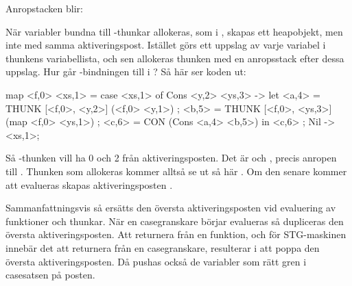 \documentclass[../Core]{subfiles}
\begin{document}
Anropstacken blir:
\begin{codeEx}
\end{codeEx}

När variabler bundna till -thunkar allokeras, som 
i , skapas ett heapobjekt, men inte med samma aktiveringspost.
Istället görs ett uppslag av varje variabel i thunkens variabellista, och
sen allokeras thunken med en anropsstack efter dessa uppslag. Hur går 
-bindningen till i ? Så här ser koden ut:

\begin{codeEx}
map <f,0> <xs,1> = case <xs,1> of
    { Cons <y,2> <ys,3> -> let
        { <a,4> = THUNK [<f,0>, <y,2>]  (<f,0> <y,1>)
        ; <b,5> = THUNK [<f,0>, <ys,3>] (map <f,0> <ys,1>)
        ; <c,6> = CON (Cons <a,4> <b,5>)
        } in <c,6>
    ; Nil -> <xs,1>};
\end{codeEx}

Så -thunken  vill ha 0 och 2 från
aktiveringsposten. Det är  och , precis anropen till
. 
Thunken som allokeras kommer alltså se ut så här
.
Om den senare kommer att evalueras skapas aktiveringsposten \ic{[cube,1]}.


Sammanfattningsvis så ersätts den översta aktiveringsposten vid 
evaluering av funktioner och thunkar. När en casegranskare börjar evalueras
så dupliceras den översta aktiveringsposten. Att returnera från en funktion,
och för STG-maskinen innebär det att returnera från en casegranskare,
resulterar i att poppa den översta aktiveringsposten. Då pushas också 
de variabler som rätt gren i casesatsen på posten.  





   



 
\end{document}
